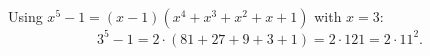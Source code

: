 Using $x^5-1=(x-1)\left(x^4+x^3+x^2+x+1\right)$ with $x=3$:
\[3^5-1=2\cdot(81+27+9+3+1)=2\cdot121=\boxed{2\cdot11^2}.\]
